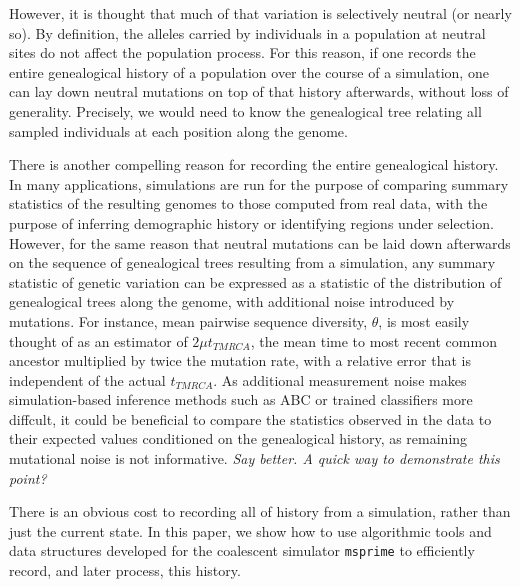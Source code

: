 \documentclass{article}
\newcommand{\msprime}{\texttt{msprime}}
\newcommand{\plr}[1]{{\em \color{blue} #1}}
\begin{document}
However, it is thought that much of that variation is selectively neutral (or nearly so).
By definition, the alleles carried by individuals in a population at neutral sites
do not affect the population process.
For this reason, if one records the entire genealogical history of a population over the course of a simulation,
one can lay down neutral mutations on top of that history afterwards,
without loss of generality.
Precisely, we would need to know the genealogical tree relating all sampled individuals
at each position along the genome.

There is another compelling reason for recording the entire genealogical history.
In many applications, simulations are run for the purpose of comparing summary statistics of the resulting genomes
to those computed from real data,
with the purpose of inferring demographic history or identifying regions under selection.
However, for the same reason that neutral mutations can be laid down afterwards on the sequence of genealogical trees resulting from a simulation,
any summary statistic of genetic variation can be expressed as a statistic of the distribution of genealogical trees along the genome,
with additional noise introduced by mutations.
For instance, mean pairwise sequence diversity, $\theta$,
is most easily thought of as an estimator of $2 \mu t_{TMRCA}$, the mean time to most recent common ancestor
multiplied by twice the mutation rate,
with a relative error that is independent of the actual $t_{TMRCA}$.
As additional measurement noise makes simulation-based inference methods such as ABC or trained classifiers more diffcult,
it could be beneficial to compare the statistics observed in the data
to their expected values conditioned on the genealogical history,
as remaining mutational noise is not informative.
\plr{Say better.  A quick way to demonstrate this point?}

There is an obvious cost to recording all of history from a simulation,
rather than just the current state.
In this paper, we show how to use algorithmic tools and data structures developed for the coalescent simulator \msprime
to efficiently record, and later process, this history.
\end{document}
